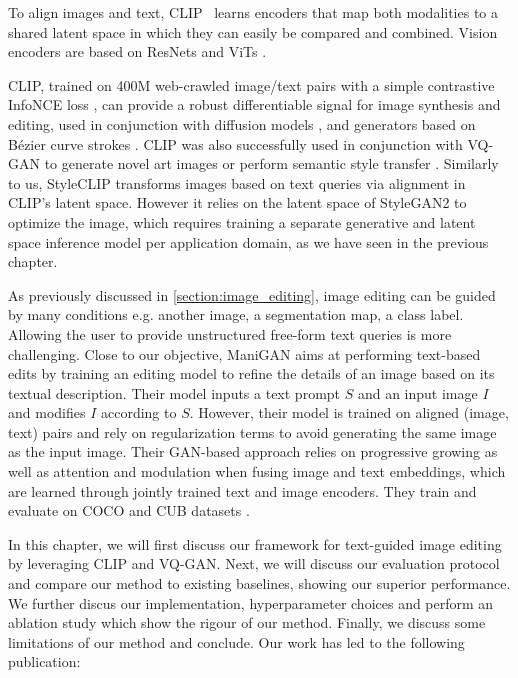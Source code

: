 To align images and text, \ac{CLIP}~\citep{radford2021learning} learns encoders that map both 
modalities to a shared latent space in which they can easily be compared and combined.
 Vision encoders are based on ResNets \citep{he2016deep} and \ac{ViT}s
  \citep{dosovitskiy2020image}.

  \ac{CLIP}, trained on 400M web-crawled image/text pairs with a simple contrastive InfoNCE
 loss \citep{oord18arxiv},  can provide a robust differentiable signal for image
  synthesis and editing, used in conjunction with diffusion 
  models \citep{kim2021diffusionclip}, and  generators based on B\'ezier curve 
  strokes \citep{frans2021clipdraw}. \ac{CLIP} was also successfully used in conjunction
   with VQ-GAN to generate novel art images \citep{vqgan_clip} or perform semantic
    style transfer \citep{vqgan_semantic_style_transfer}.
Similarly to us, StyleCLIP \citep{patashnik2021styleclip} transforms images based
 on text queries via alignment in \ac{CLIP}'s latent space. However it relies on the 
 latent space of StyleGAN2 \citep{karra2020stylegan2} to optimize the image, which requires training a separate 
 generative and latent space inference model per application domain, as we have seen in the previous chapter.

As previously discussed in \ref{section:image_editing}, image editing can be guided by 
many conditions e.g. another image, a segmentation map, a class label. Allowing the user 
to provide unstructured free-form text queries is more challenging. 
Close to our objective,  ManiGAN \citep{li2020manigan} aims at performing 
text-based edits by training an editing model to refine the details of an image based on its 
textual description. Their model inputs a text prompt $S$ and an input image $I$ and 
modifies $I$ according to $S$. However, their model is trained on aligned (image, text)
pairs and rely on regularization terms to avoid generating the same image as the input image.
Their GAN-based approach relies on progressive growing as well as attention and modulation 
when fusing image and text embeddings, which are learned through jointly trained text and image encoders. 
They train and evaluate on COCO \citep{caesar2018cocoostuff} and CUB datasets \citep{welinder2010cub200}.

In this chapter, we will first discuss our framework for text-guided image editing by leveraging \ac{CLIP} 
and VQ-GAN. Next, we will discuss our evaluation protocol and compare our method to existing baselines, 
showing our superior performance. We further discus our implementation, hyperparameter choices and perform an 
ablation study which show the rigour of our method. Finally, we discuss some limitations of our method and 
conclude. Our work has led to the following publication:

